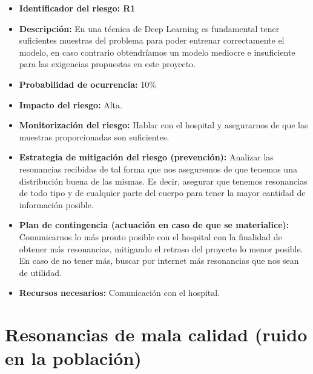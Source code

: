 \begin{itemize}
	\item \textbf{Identificador del riesgo: R1 }
	\item \textbf{Descripción: } En una técnica de Deep Learning es fundamental tener suficientes muestras del problema para poder entrenar correctamente el modelo, en caso contrario obtendríamos un modelo mediocre e insuficiente para las exigencias propuestas en este proyecto.
	\item \textbf{Probabilidad de ocurrencia: } 10\%
	\item \textbf{Impacto del riesgo: } Alta.
	\item \textbf{Monitorización del riesgo: } Hablar con el hospital y asegurarnos de que las muestras proporcionadas son suficientes.  
	\item \textbf{Estrategia de mitigación del riesgo (prevención): } Analizar las resonancias recibidas de tal forma que nos aseguremos de que tenemos una distribución buena de las mismas. Es decir, asegurar que tenemos resonancias de todo tipo y de cualquier parte del cuerpo para tener la mayor cantidad de información posible.  
	\item \textbf{Plan de contingencia (actuación en caso de que se materialice): } Comunicarnos lo más pronto posible con el hospital con la finalidad de obtener más resonancias, mitigando el retraso del proyecto lo menor posible. En caso de no tener más, buscar por internet más resonancias que nos sean de utilidad.
	\item \textbf{Recursos necesarios: } Comunicación con el hospital.
\end{itemize}

\section{Resonancias de mala calidad (ruido en la población)}

